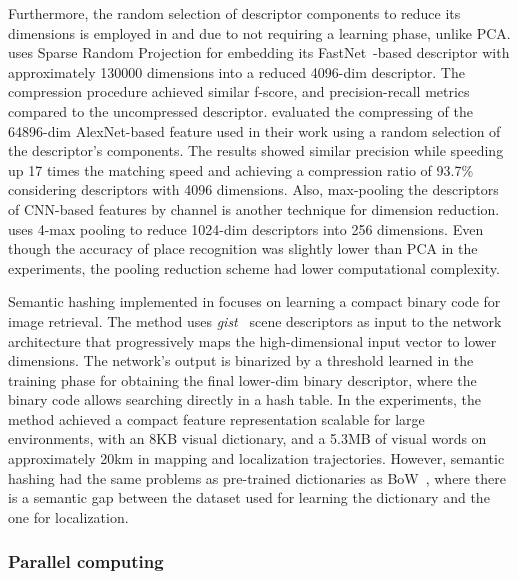 Furthermore, the random selection of descriptor components to reduce its dimensions is employed in \cite{naseer-et-al:2017:7989305} and \cite{xin-et-al:2017:8310121} due to not requiring a learning phase, unlike PCA.
\cite{naseer-et-al:2017:7989305} uses Sparse Random Projection for embedding its FastNet~\parencite{original:fast-net}-based descriptor with approximately 130000 dimensions into a reduced 4096-dim descriptor. The compression procedure achieved similar f-score, and precision-recall metrics compared to the uncompressed descriptor.
\cite{xin-et-al:2017:8310121} evaluated the compressing of the 64896-dim AlexNet-based feature used in their work using a random selection of the descriptor's components. The results showed similar precision while speeding up 17 times the matching speed and achieving a compression ratio of 93.7\% considering descriptors with 4096 dimensions.
Also, max-pooling the descriptors of CNN-based features by channel is another technique for dimension reduction.
\cite{yu-et-al:2019:8961714} uses 4-max pooling to reduce 1024-dim descriptors into 256 dimensions. Even though the accuracy of place recognition was slightly lower than PCA in the experiments, the pooling reduction scheme had lower computational complexity.

Semantic hashing implemented in \cite{ikeda-tanaka:2010:5509579} focuses on learning a compact binary code for image retrieval. The method uses \textit{gist}~\parencite{original:gist} scene descriptors as input to the network architecture that progressively maps the high-dimensional input vector to lower dimensions. The network's output is binarized by a threshold learned in the training phase for obtaining the final lower-dim binary descriptor, where the binary code allows searching directly in a hash table. In the experiments, the method achieved a compact feature representation scalable for large environments, with an 8KB visual dictionary, and a 5.3MB of visual words on approximately 20km in mapping and localization trajectories. However, semantic hashing had the same problems as pre-trained dictionaries as BoW~\parencite{discussion:bow}, where there is a semantic gap between the dataset used for learning the dictionary and the one for localization.



\subsubsection{Parallel computing}

